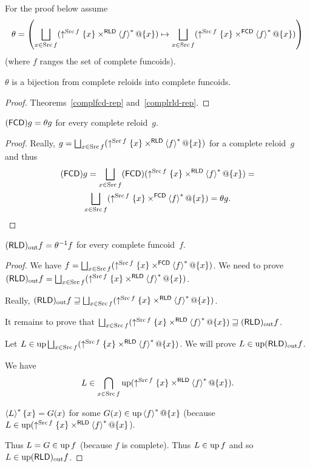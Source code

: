 For the proof below assume 
\[
\theta=\left(\bigsqcup_{x\in\Src f}(\uparrow^{\Src f}\{x\}\times^{\mathsf{RLD}}\rsupfun f@\{x\})\mapsto\bigsqcup_{x\in\Src f}(\uparrow^{\Src f}\{x\}\times^{\mathsf{FCD}}\rsupfun f@\{x\})\right)
\]
 (where $f$ ranges the set of complete funcoids).
\begin{lem}
$\theta$ is a bijection from complete reloids into complete funcoids.\end{lem}
\begin{proof}
Theorems~\ref{complfcd-rep} and~\ref{complrld-rep}.\end{proof}
\begin{lem}
$(\mathsf{FCD}) g=\theta g$ for every complete reloid~$g$.\end{lem}
\begin{proof}
Really, $g=\bigsqcup_{x\in\Src f}(\uparrow^{\Src f}\{x\}\times^{\mathsf{RLD}}\rsupfun f@\{x\})$
for a complete reloid~$g$ and thus 
\begin{multline*}
\tofcd g=\bigsqcup_{x\in\Src f}\tofcd(\uparrow^{\Src f}\{x\}\times^{\mathsf{RLD}}\rsupfun f@\{x\})=\\
\bigsqcup_{x\in\Src f}(\uparrow^{\Src f}\{x\}\times^{\mathsf{FCD}}\rsupfun f@\{x\})=\theta g.
\end{multline*}
\end{proof}
\begin{lem}
$(\mathsf{RLD})_{\mathrm{out}} f=\theta^{-1}f$ for every complete funcoid~$f$.\end{lem}
\begin{proof}
We have $f=\bigsqcup_{x\in\Src f}(\uparrow^{\Src f}\{x\}\times^{\mathsf{FCD}}\rsupfun f@\{x\})$.
We need to prove $\torldout f=\bigsqcup_{x\in\Src f}(\uparrow^{\Src f}\{x\}\times^{\mathsf{RLD}}\rsupfun f@\{x\})$.

Really, $\torldout f\sqsupseteq\bigsqcup_{x\in\Src f}(\uparrow^{\Src f}\{x\}\times^{\mathsf{RLD}}\rsupfun f@\{x\})$.

It remains to prove that $\bigsqcup_{x\in\Src f}(\uparrow^{\Src f}\{x\}\times^{\mathsf{RLD}}\rsupfun f@\{x\})\sqsupseteq\torldout f$.

Let $L\in\up\bigsqcup_{x\in\Src f}(\uparrow^{\Src f}\{x\}\times^{\mathsf{RLD}}\rsupfun f@\{x\})$.
We will prove $L\in\operatorname{up}(\mathsf{RLD})_{\mathrm{out}} f$.

We have 
\[
L\in\bigcap_{x\in\operatorname{Src} f}\operatorname{up}(\uparrow^{\operatorname{Src} f}\{x\}\times^{\mathsf{RLD}}\left\langle f\right\rangle ^{\ast}@\{x\}).
\]

$\left\langle L\right\rangle ^{\ast}\{x\} = G(x)$ for some $G(x)\in\operatorname{up}\left\langle f\right\rangle ^{\ast}@\{x\}$ (because
$L\in\operatorname{up}(\uparrow^{\operatorname{Src} f}\{x\}\times^{\mathsf{RLD}}\left\langle f\right\rangle ^{\ast}@\{x\}$).

Thus $L=G\in\operatorname{up} f$ (because $f$ is complete). Thus $L\in\operatorname{up} f$ and so $L\in\operatorname{up}(\mathsf{RLD})_{\mathrm{out}} f$.

\end{proof}
